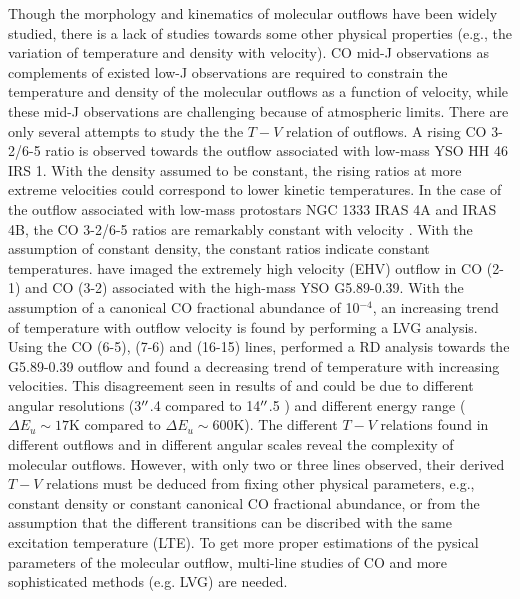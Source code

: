 Though the morphology and kinematics of molecular outflows have been widely studied, there is a lack of studies towards some other physical properties (e.g., the variation of temperature and density with velocity). CO mid-J observations as complements of existed low-J observations are required to constrain the temperature and density of the molecular outflows as a function of velocity, while these mid-J observations are challenging because of atmospheric limits. There are only several attempts to study the the $T-V$ relation of outflows. A rising CO 3-2/6-5 ratio is observed towards the outflow associated with low-mass YSO HH 46 IRS 1\citep{2009A&A...501..633V}. With the density assumed to be constant, the rising ratios at more extreme velocities could correspond to lower kinetic temperatures. In the case of the outflow associated with low-mass protostars NGC 1333 IRAS 4A and  IRAS 4B, the CO 3-2/6-5 ratios are remarkably constant with velocity \citep{2012A&A...542A..86Y}. With the assumption of constant density, the constant ratios indicate constant temperatures. \citet{2012ApJ...744L..26S} have imaged the extremely high velocity (EHV) outflow in CO (2-1) and CO (3-2) associated with the high-mass YSO G5.89-0.39. With the assumption of a canonical CO fractional abundance of 10$^{-4}$, an increasing trend of temperature with outflow velocity is found by performing a LVG analysis. Using the CO (6-5), (7-6) and (16-15) lines, \citet{2015A&A...584A..70L} performed a RD analysis towards the G5.89-0.39 outflow and found a decreasing trend of temperature with increasing velocities. This disagreement seen in results of \citet{2012ApJ...744L..26S} and \citet{2015A&A...584A..70L} could be due to different angular resolutions (3${\mbox{$^{\prime\prime}$}}$.4 compared to 14${\mbox{$^{\prime\prime}$}}$.5 ) and different energy range ($\Delta E_u \sim 17 $K compared to $\Delta E_u \sim 600 $K). The different $T-V$ relations found in different outflows and in different angular scales reveal the complexity of molecular outflows. However, with only two or three lines observed, their derived $T-V$ relations must be deduced from fixing other physical parameters, e.g., constant density or constant canonical CO fractional abundance, or from the assumption that the different transitions can be discribed with the same excitation temperature (LTE). To get more proper estimations of the pysical parameters of the molecular outflow, multi-line studies of CO and more sophisticated methods (e.g. LVG) are needed.

